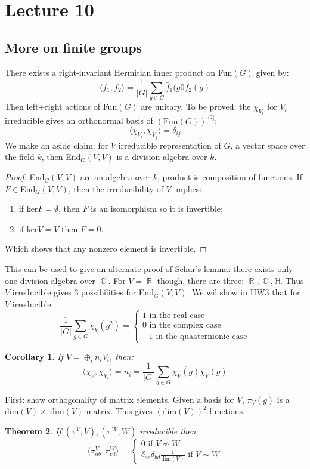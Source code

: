 \documentclass[12 pt]{article}
\DeclareMathOperator {\R} {\mathbb{R}}
\DeclareMathOperator {\C} {\mathbb{C}}
\theoremstyle{plain}
\newtheorem{thm}{Theorem}
\newtheorem{cor}[thm]{Corollary}
\theoremstyle{definition}
\theoremstyle{remark}
\begin{document}
\section*{Lecture 10}
\subsection*{More on finite groups}
There exists a right-invariant Hermitian inner product on Fun$(G)$ given by:
\[    \langle f_1, f_2 \rangle = \frac{1}{|G|} \sum_{g\in G} \bar f_1 (g0 f_2 (g)      \]
Then left+right actions of Fun$(G)$ are unitary. To be proved: the $\chi_{V_i}$ for $V_i$ irreducible gives an orthonormal basis of $(\text{Fun}(G))^{|G|}$:
\[      \langle \chi_{V_i} , \chi_{V_j} \rangle = \delta_{ij}   \]
We make an aside claim: for $V$ irreducible representation of $G$, a vector space over the field $k$, then End$_{G} (V,V)$ is a division algebra over $k$.
\begin{proof}
End$_{G}(V,V)$ are an algebra over $k$, product is composition of functions. If $F\in $End$_{G}(V,V)$, then the irreducibility of $V$ implies:
\begin{enumerate}
\item if ker$F = \emptyset$, then $F$ is an isomorphism so it is invertible;
\item if ker$V = V$ then $F=0$.
\end{enumerate}
Which shows that any nonzero element is invertible.
\end{proof}
This can be used to give an alternate proof of Schur's lemma: there exists only one division algebra over $\C$. For $V=\R$ though, there are three: $\R,\C, \mathbb{H}$. Thus $V$ irreducible gives 3 possibilities for End$_G(V,V)$.
We wil show in HW3 that for $V$ irreducible:
\[     \frac{1}{|G|} \sum_{g\in G} \chi_V (g^2) =\left\{ \begin{array} {c}  1 \text{   in the real case} \\  0 \text{   in the complex case} \\ -1 \text{   in the quaaternionic case} \end{array} \right.    \]
\begin{cor}
If $V = \oplus_i n_i V_i$, then:
\[      \langle \chi_V , \chi_{V_i} \rangle = n_i =     \frac{1}{|G|} \sum_{g\in G} \overline{\chi_V (g)}  \chi_V (g)  \]
\end{cor}
First: show orthogonality of matrix elements. Given a basis for $V$, $\pi_V(g)$ is a dim$(V) \times$ dim$(V)$ matrix. This gives $(\text{dim}(V))^2$ functions.
\begin{thm}
If $(\pi^V, V) , (\pi^W,W)$ irreducible then 
\[      \langle \pi^V_{ab} , \pi^W_{cd} \rangle = \left\{ \begin{array} {c}  0 \text{   if } V\not \sim W \\  \delta_{ac}\delta_{bd} \frac{1}{\text{dim}(V)} \text{   if } V \sim W  \end{array} \right.  \]
\end{thm}
\end{document}
